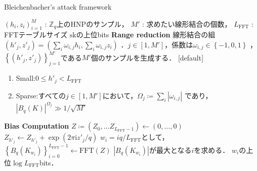 \documentclass[dvipdfm]{beamer}
\theoremstyle{example}
\begin{document}
\begin{frame}%
    \vspace{-10pt}
    \begin{algorithm}[H]
        \caption{Bleichenbacher's attack framework}
        \label{alg_Bleichenbacher}
        \begin{algorithmic}[1]
            \scriptsize
            \renewcommand{\algorithmicrequire}{\textbf{Input:}}
            \renewcommand{\algorithmicensure}{\textbf{Output:}}
            \REQUIRE ${\left(h_i,z_i\right)}^M_{i=1}$ : $\mathbb{Z}_q$上のHNPのサンプル，
            $M'$ : 求めたい線形結合の個数，
            $L_{\mathrm{FFT}}$ : FFTテーブルサイズ
            \ENSURE $\mathrm{sk}$の上位bits
            \STATE \textbf{Range  reduction}
            \STATE 線形結合の組
            $\left(h'_j,z'_j\right)=\left(\sum_i \omega_{i,j}h_i, \sum_i \omega_{i,j} z_i\right)$
            ．$j\in \left[1,M'\right]$，係数は$\omega_{i,j}\in\left\{-1,0,1\right\}$
            ，$\left\{\left(h'_j,z'_j\right)\right\}^{M'}_{j=1}$である$M'$個のサンプルを生成する．
            [default]
            \begin{enumerate}[(1)]
                \item Small:$0\leq h'_j<L_{\mathrm{FFT}}$
                \item Sparse:すべての$j\in\left[1,M'\right]$において，$\Omega_j \coloneqq  \sum_i|\omega_{i,j}|$
                      であり，$|B_q\left(K\right)|^{\Omega_j}\gg 1/\sqrt{M'}$
            \end{enumerate}
            \STATE \textbf{Bias Computation}
            \STATE $Z \coloneqq  \left(Z_0,\ldots Z_{L_{\mathrm{FFT}}-1}\right) \leftarrow \left(0,\ldots,0\right) $
            \STATE $Z_{h'_j}\leftarrow Z_{h'_j}+\exp\left(2\pi\mathrm{i} z'_j/q\right)$
            \ENDFOR
            \STATE $w_i=iq/L_{\mathrm{FFT}}$として，
            $\left\{B_q\left(K_{w_i}\right)\right\}^{L_{\mathrm{FFT}}-1}_{i=0} \leftarrow \mathrm{FFT}\left(Z\right)$%
            \STATE $|B_q\left(K_{w_i}\right)|$が最大となる$i$を求める．
            \RETURN $w_i$の上位$\log{L_{\mathrm{FFT}}}$bits．
            \normalsize
        \end{algorithmic}
    \end{algorithm}
    \normalsize
\end{frame}
\end{document}
